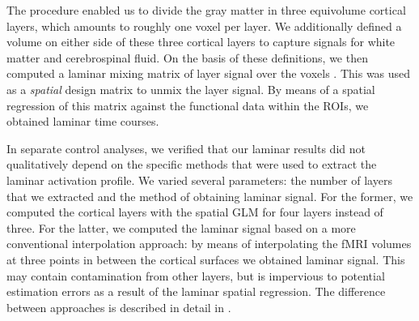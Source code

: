 \documentclass[9pt,lineno]{aperture}
\begin{document}
The procedure enabled us to divide the gray matter in three equivolume cortical layers, which amounts to roughly one voxel per layer. We additionally defined a volume on either side of these three cortical layers to capture signals for white matter and cerebrospinal fluid. On the basis of these definitions, we then computed a laminar mixing matrix of layer signal over the voxels \citep{VanMourik2018}. This was used as a \emph{spatial} design matrix to unmix the layer signal. By means of a spatial regression of this matrix against the functional data within the ROIs, we obtained laminar time courses.

In separate control analyses, we verified that our laminar results did not qualitatively depend on the specific methods that were used to extract the laminar activation profile. We varied several parameters: the number of layers that we extracted and the method of obtaining laminar signal. For the former, we computed the cortical layers with the spatial GLM for four layers instead of three. For the latter, we computed the laminar signal based on a more conventional interpolation approach: by means of interpolating the fMRI volumes at three points in between the cortical surfaces we obtained laminar signal. This may contain contamination from other layers, but is impervious to potential estimation errors as a result of the laminar spatial regression. The difference between approaches is described in detail in \citet{VanMourik2018}.
\end{document}
